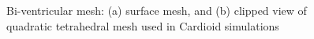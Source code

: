 \begin{figure}[ht]
\centering
{}
%
\caption{Bi-ventricular mesh: (a) surface mesh, and (b) clipped view of quadratic tetrahedral mesh used in Cardioid simulations}
\label{fig:tetmesh}
\end{figure}

